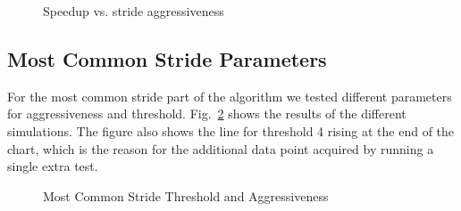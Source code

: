 \begin{figure}
	
	\caption{Speedup vs. stride aggressiveness}
	\label{fig:aggr}
\end{figure}

\subsection{Most Common Stride Parameters}

For the most common stride part of the algorithm we tested different parameters
for aggressiveness and threshold. Fig.~\ref{fig:mcs_tweaks} shows the results
of the different simulations.
The figure also shows the line for threshold 4 rising at the end of the chart,
which is the reason for the additional data point acquired by running a single
extra test.

\begin{figure}
	
	\caption{Most Common Stride Threshold and Aggressiveness}
	\label{fig:mcs_tweaks}
\end{figure}
